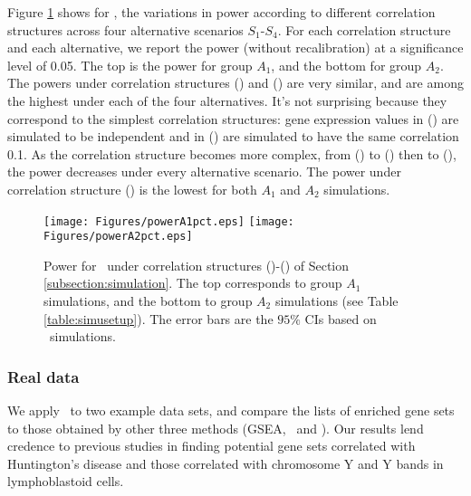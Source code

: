 	Figure \ref{fig:power} shows for \OurMethod, the variations in power according to different
	correlation structures across four alternative scenarios $S_1$-$S_4$. For each correlation 
	structure
	and each alternative, we report the power (without recalibration) at a significance level of 
	0.05.
	The top is the power for group $A_1$, and the bottom for group $A_2$.  The powers under 
	correlation structures (\aaCase)
	and (\cCase) are very similar, and are among the highest under each of the four alternatives. 
	It's
	not surprising because they correspond to the simplest correlation structures: gene expression
	values in (\aaCase) are simulated to be independent and in (\cCase) are simulated to have the 
	same
	correlation 0.1. As the correlation structure becomes more complex, from (\aCase) to (\eCase) 
	then
	to (\fCase), the power decreases under every alternative scenario. The power under correlation
	structure (\fCase) is the lowest for both $A_1$ and $A_2$ simulations.%
	
	\begin{figure}[!ht]
	\centering
			\texttt{[image: Figures/powerA1pct.eps]}
			\texttt{[image: Figures/powerA2pct.eps]}
		\caption[Power for \OurMethod~under correlation structures (\aaCase)-(\fCase)]{Power for 
		\OurMethod~under correlation structures (\aaCase)-(\fCase) of Section
			\ref{subsection:simulation}. The top corresponds to group $A_1$ simulations, and the 
			bottom to group
			$A_2$ simulations (see Table \ref{table:simusetup}). The error bars are the $95\%$ CIs 
			based on
			\HowmanySimu~simulations. }\label{fig:power}
	\end{figure} 
	

	\subsubsection{Real data}\label{section:realdata}
	We apply \OurMethod~to two example data sets, and compare the lists of enriched gene sets to 
	those
	obtained by other three methods (GSEA, \CMT~and \genr). %
	Our results lend credence to previous studies in finding potential gene sets correlated with
	Huntington's disease and those correlated with chromosome Y and Y bands in lymphoblastoid 
	cells.  
	
